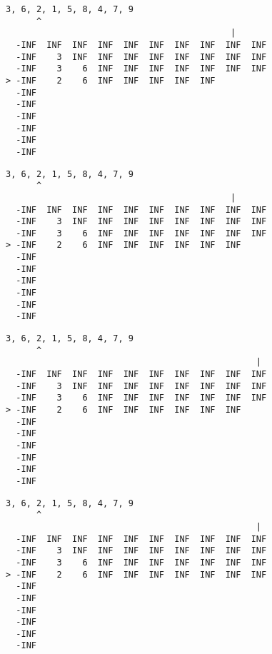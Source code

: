 { \begin{verbatim}
3, 6, 2, 1, 5, 8, 4, 7, 9
      ^
                                            |
  -INF  INF  INF  INF  INF  INF  INF  INF  INF  INF
  -INF    3  INF  INF  INF  INF  INF  INF  INF  INF
  -INF    3    6  INF  INF  INF  INF  INF  INF  INF
> -INF    2    6  INF  INF  INF  INF  INF          
  -INF                                             
  -INF                                             
  -INF                                             
  -INF                                             
  -INF                                             
  -INF                                             
\end{verbatim} }

{ \begin{verbatim}
3, 6, 2, 1, 5, 8, 4, 7, 9
      ^
                                            |
  -INF  INF  INF  INF  INF  INF  INF  INF  INF  INF
  -INF    3  INF  INF  INF  INF  INF  INF  INF  INF
  -INF    3    6  INF  INF  INF  INF  INF  INF  INF
> -INF    2    6  INF  INF  INF  INF  INF  INF     
  -INF                                             
  -INF                                             
  -INF                                             
  -INF                                             
  -INF                                             
  -INF                                             
\end{verbatim} }

{ \begin{verbatim}
3, 6, 2, 1, 5, 8, 4, 7, 9
      ^
                                                 |
  -INF  INF  INF  INF  INF  INF  INF  INF  INF  INF
  -INF    3  INF  INF  INF  INF  INF  INF  INF  INF
  -INF    3    6  INF  INF  INF  INF  INF  INF  INF
> -INF    2    6  INF  INF  INF  INF  INF  INF     
  -INF                                             
  -INF                                             
  -INF                                             
  -INF                                             
  -INF                                             
  -INF                                             
\end{verbatim} }

{ \begin{verbatim}
3, 6, 2, 1, 5, 8, 4, 7, 9
      ^
                                                 |
  -INF  INF  INF  INF  INF  INF  INF  INF  INF  INF
  -INF    3  INF  INF  INF  INF  INF  INF  INF  INF
  -INF    3    6  INF  INF  INF  INF  INF  INF  INF
> -INF    2    6  INF  INF  INF  INF  INF  INF  INF
  -INF                                             
  -INF                                             
  -INF                                             
  -INF                                             
  -INF                                             
  -INF                                             
\end{verbatim} }

